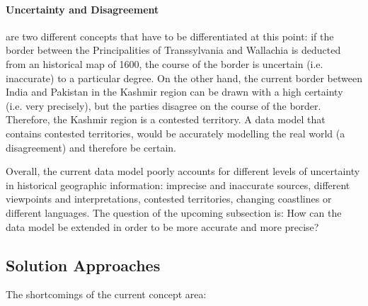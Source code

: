 
\paragraph{Uncertainty and Disagreement} %
\label{par:uncertainty_vs_disagreement}

are two different concepts that have to be differentiated at this point: if the border between the Principalities of Transsylvania and Wallachia is deducted from an historical map of 1600, the course of the border is uncertain (i.e. inaccurate) to a particular degree. On the other hand, the current border between India and Pakistan in the Kashmir region can be drawn with a high certainty (i.e. very precisely), but the parties disagree on the course of the border. Therefore, the Kashmir region is a contested territory. A data model that contains contested territories, would be accurately modelling the real world (a disagreement) and therefore be certain.




Overall, the current data model poorly accounts for different levels of uncertainty in historical geographic information: imprecise and inaccurate sources, different viewpoints and interpretations, contested territories, changing coastlines or different languages. The question of the upcoming subsection is: How can the data model be extended in order to be more accurate and more precise?



\subsection{Solution Approaches} %
\label{sub:solution_approaches}

The shortcomings of the current concept area:

